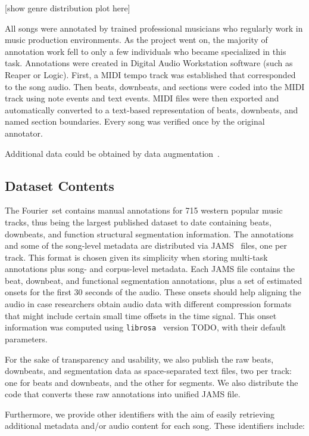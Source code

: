\documentclass{article}
\newcommand{\setName}{Fourier}
\begin{document}
[show genre distribution plot here]

All songs were annotated by trained professional musicians who regularly work in music production environments. As the project went on, the majority of annotation work fell to only a few individuals who became specialized in this task. Annotations were created in Digital Audio Workstation software (such as Reaper or Logic). First, a MIDI tempo track was established that corresponded to the song audio. Then beats, downbeats, and sections were coded into the MIDI track using note events and text events. MIDI files were then exported and automatically converted to a text-based representation of beats, downbeats, and named section boundaries. Every song was verified once by the original annotator.

Additional data could be obtained by data augmentation~\cite{Mcfee2015}.

\subsection{Dataset Contents}

The \setName~set contains manual annotations for 715 western popular music tracks, thus being the largest published  dataset to date containing beats, downbeats, and function structural segmentation information.
The annotations and some of the song-level metadata are distributed via JAMS~\cite{Humphrey2014} files, one per track.
This format is chosen given its simplicity when storing multi-task annotations plus song- and corpus-level metadata.
Each JAMS file contains the beat, downbeat, and functional segmentation annotations, plus a set of estimated onsets for the first 30 seconds of the audio.
These onsets should help aligning the audio in case researchers obtain audio data with different compression formats that might include certain small time offsets in the time signal.
This onset information was computed using \texttt{librosa}~\cite{Mcfee2015a} version TODO, with their default parameters.

For the sake of transparency and usability, we also publish the raw beats, downbeats, and segmentation data as space-separated text files, two per track: one for beats and downbeats, and the other for segments.
We also distribute the code that converts these raw annotations into unified JAMS file.

Furthermore, we provide other identifiers with the aim of easily retrieving additional metadata and/or audio content for each song.
These identifiers include:
\end{document}
